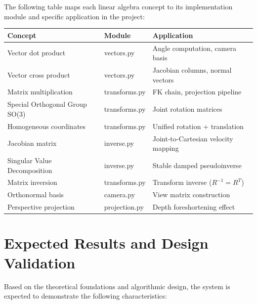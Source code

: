 \documentclass[11pt]{article}
\begin{document}
The following table maps each linear algebra concept to its implementation module and specific application in the project:

\begin{table}[H]
\centering
\begin{tabular}{@{}lll@{}}
\toprule
\textbf{Concept} & \textbf{Module} & \textbf{Application} \\
\midrule
Vector dot product & vectors.py & Angle computation, camera basis \\
Vector cross product & vectors.py & Jacobian columns, normal vectors \\
Matrix multiplication & transforms.py & FK chain, projection pipeline \\
Special Orthogonal Group SO(3) & transforms.py & Joint rotation matrices \\
Homogeneous coordinates & transforms.py & Unified rotation + translation \\
Jacobian matrix & inverse.py & Joint-to-Cartesian velocity mapping \\
Singular Value Decomposition & inverse.py & Stable damped pseudoinverse \\
Matrix inversion & transforms.py & Transform inverse ($R^{-1} = R^T$) \\
Orthonormal basis & camera.py & View matrix construction \\
Perspective projection & projection.py & Depth foreshortening effect \\
\bottomrule
\end{tabular}
\end{table}

\section{Expected Results and Design Validation}

Based on the theoretical foundations and algorithmic design, the system is expected to demonstrate the following characteristics:
\end{document}
